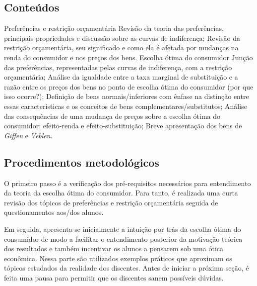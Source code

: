 \documentclass[
	article,			%
	12pt,				%
	twoside,			%
	a4paper,			%
	section=TITLE,		%
	english,			%
	brazil,				%
	sumario=tradicional
]{abntex2-modelo-plano-de-aula}
\begin{document}
\clearpage%

\begin{snugshade}
	\section{\textbf{Conteúdos}} %
\end{snugshade}

\begin{outline}
    \1 Preferências e restrição orçamentária
        \2 Revisão da teoria das preferências, principais propriedades e discussão sobre as curvas de indiferença;
        \2 Revisão da restrição orçamentária, seu significado e como ela é afetada por mudanças na renda do consumidor e nos preços dos bens.
	\1 Escolha ótima do consumidor
		\2 Junção das preferências, representadas pelas curvas de indiferença, com a restrição orçamentária;
		\2 Análise da igualdade entre a taxa marginal de substituição e a razão entre os preços dos bens no ponto de escolha ótima do consumidor (por que isso ocorre?);
		\2 Definição de bens normais/inferiores com ênfase na distinção entre essas características e os conceitos de bens complementares/substitutos;
		\2 Análise das consequências de uma mudança de preços sobre a escolha ótima do consumidor: efeito-renda e efeito-substituição;
		\2 Breve apresentação dos bens de \textit{Giffen} e \textit{Veblen}.
\end{outline}


\begin{snugshade}
	\section{\textbf{Procedimentos metodológicos}} %
\end{snugshade}

O primeiro passo é a verificação dos pré-requisitos necessários para entendimento da teoria da escolha ótima do consumidor. Para tanto, é realizada uma curta revisão dos tópicos de preferências e restrição orçamentária seguida de questionamentos aos/dos alunos.

Em seguida, apresenta-se inicialmente a intuição por trás da escolha ótima do consumidor de modo a facilitar o entendimento posterior da motivação teórica dos resultados e também incentivar os alunos a pensarem sob uma ótica econômica. Nessa parte são utilizados exemplos práticos que aproximam os tópicos estudados da realidade dos discentes. Antes de iniciar a próxima seção, é feita uma pausa para permitir que os discentes sanem possíveis dúvidas.
\end{document}
